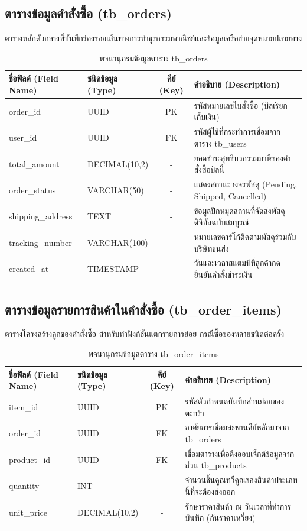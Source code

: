 \subsection{ตารางข้อมูลคำสั่งซื้อ (tb\_orders)}
ตารางหลักตัวกลางที่บันทึกร่องรอยเส้นทางการทำธุรกรรมพาณิชย์และข้อมูลเครือข่ายจุดหมายปลายทาง
\begin{table}[h!]
\centering
\caption{พจนานุกรมข้อมูลตาราง tb\_orders}
\vspace{0.2cm}
\begin{tabular}{|l|l|c|l|}
\hline
\textbf{ชื่อฟิลด์ (Field Name)} & \textbf{ชนิดข้อมูล (Type)} & \textbf{คีย์ (Key)} & \textbf{คำอธิบาย (Description)} \\ \hline
order\_id & UUID & PK & รหัสหมายเลขใบสั่งซื้อ (บิลเรียกเก็บเงิน) \\ \hline
user\_id & UUID & FK & รหัสผู้ใช้ที่กระทำการเชื่อมจากตาราง tb\_users \\ \hline
total\_amount & DECIMAL(10,2) & - & ยอดชำระสุทธิบวกรวมภาษีของคำสั่งซื้อบิลนี้ \\ \hline
order\_status & VARCHAR(50) & - & แสดงสถานะวงจรพัสดุ (Pending, Shipped, Cancelled) \\ \hline
shipping\_address & TEXT & - & ข้อมูลปักหมุดสถานที่จัดส่งพัสดุดิจิทัลฉบับสมบูรณ์ \\ \hline
tracking\_number & VARCHAR(100) & - & หมายเลขคาร์โก้ติดตามพัสดุร่วมกับบริษัทขนส่ง \\ \hline
created\_at & TIMESTAMP & - & วันและเวลาสแตมป์ที่ลูกค้ากดยืนยันคำสั่งชำระเงิน \\ \hline
\end{tabular}
\end{table}

\subsection{ตารางข้อมูลรายการสินค้าในคำสั่งซื้อ (tb\_order\_items)}
ตารางโครงสร้างลูกของคำสั่งซื้อ สำหรับทำฟังก์ชันแตกรายการย่อย กรณีซื้อของหลายชนิดต่อครั้ง
\begin{table}[h!]
\centering
\caption{พจนานุกรมข้อมูลตาราง tb\_order\_items}
\vspace{0.2cm}
\begin{tabular}{|l|l|c|l|}
\hline
\textbf{ชื่อฟิลด์ (Field Name)} & \textbf{ชนิดข้อมูล (Type)} & \textbf{คีย์ (Key)} & \textbf{คำอธิบาย (Description)} \\ \hline
item\_id & UUID & PK & รหัสตัวกำหนดบันทึกส่วนย่อยของตะกร้า \\ \hline
order\_id & UUID & FK & อาศัยการเชื่อมสะพานคีย์หลักมาจาก tb\_orders \\ \hline
product\_id & UUID & FK & เชื่อมตารางเพื่อดึงออบเจ็กต์ข้อมูลจากส่วน tb\_products \\ \hline
quantity & INT & - & จำนวนชิ้นคูณทวีคูณของสินค้าประเภทนี้ที่จะต้องส่งออก \\ \hline
unit\_price & DECIMAL(10,2) & - & รักษาราคาสินค้า ณ วันเวลาที่ทำการบันทึก (กันราคาเหวี่ยง) \\ \hline
\end{tabular}
\end{table}

